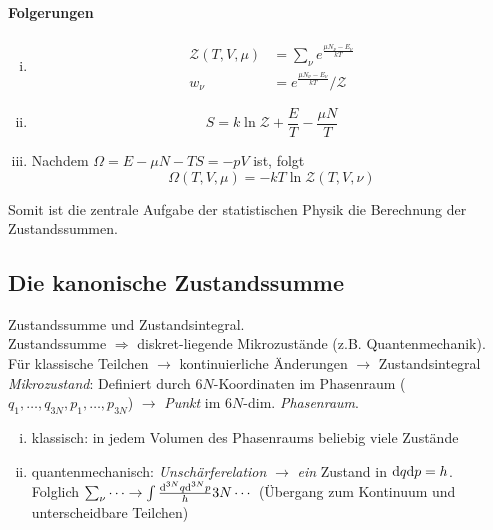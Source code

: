 \paragraph{Folgerungen}
\begin{enumerate}[i)]
    \item
    \begin{equation}
        \begin{split}
            \mathcal{Z}(T, V, \mu) &= \sum_\nu e^{\frac{\mu N_\nu - E_\nu}{k T}} \\
            w_\nu &= e^{\frac{\mu N_\nu - E_\nu}{k T}} / \mathcal{Z}
        \end{split}
    \end{equation}
    \item
    \begin{equation}
        S = k \ln \mathcal{Z} + \frac{E}{T} - \frac{\mu N}{T}
    \end{equation}
    \item Nachdem $\Omega = E - \mu N - T S = - p V$ ist, folgt
    \begin{equation}
        \Omega(T, V, \mu) = - k T \ln \mathcal{Z}(T, V, \nu)
    \end{equation}
\end{enumerate}
Somit ist die zentrale Aufgabe der statistischen Physik die Berechnung der Zustands\-summen.

\subsection{Die kanonische Zustandssumme}
Zustandssumme und Zustandsintegral. \\
Zustandssumme $\Rightarrow$ diskret-liegende Mikrozustände (z.B. Quantenmechanik). \\
Für klassische Teilchen $\rightarrow$ kontinuierliche Änderungen $\rightarrow$ Zustandsintegral \\
\emph{Mikrozustand}: Definiert durch $6N$-Koordinaten im Phasenraum ($q_1, \ldots, q_{3N}, p_1, \ldots, p_{3N}$) $\rightarrow$ \emph{Punkt} im
$6N$-dim. \emph{Phasenraum}.
\begin{enumerate}[i)]
    \item klassisch: in jedem Volumen des Phasenraums beliebig viele Zustände
    \item quantenmechanisch: \emph{Unschärferelation} $\rightarrow$ \emph{ein} Zustand in $\mathrm{d} q \mathrm{d} p = h$. \\
    Folglich $\sum_\nu \cdots \rightarrow \int \frac{\mathrm{d}^{3N} q \mathrm{d}^{3N} p}{h} {3N} \cdots$ (Übergang zum Kontinuum und unterscheidbare Teilchen)
\end{enumerate}
